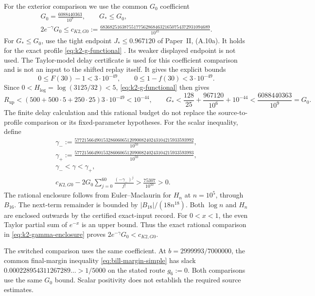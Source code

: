 For the exterior comparison we use the common $G_0$ coefficient
\begin{equation}\label{eq:k2-certificate}
\begin{gathered}
 G_0=\frac{6088440363}{10^9},\qquad
 G_*\le G_0,\\
 2e^{-\gamma}G_0\le c_{K2,G0}
 :=\frac{6836825163875517756286846321650754372931094689}{10^{45}}.
\end{gathered}
\end{equation}
For \(G_*\le G_0\), use the tight endpoint
\(J_*\le0.967120\) of Paper~II, (A.10a). It holds for the exact profile
\eqref{eq:k2-g-functional} \cite[(4.73), (4.75), (A.10a)]{PaperII}.
Its weaker displayed endpoint is not used.
The Taylor-model delay certificate is used for this coefficient comparison
and is not an input to the shifted replay itself. It gives the explicit bounds
\[
 0\le F(30)-1<3\cdot10^{-49},\qquad
 0\le1-f(30)<3\cdot10^{-49}.
\]
Since \(0<H_{\log}=\log(3125/32)<5\),
\eqref{eq:k2-g-functional} then gives
\[
 R_{\mathrm{up}}< (500+500\cdot5+250\cdot25)3\cdot10^{-49}
 <10^{-44},\qquad
 G_*<\frac{128}{25}+\frac{967120}{10^6}+10^{-44}
 <\frac{6088440363}{10^9}=G_0.
\]
The finite delay calculation and this rational budget do not replace the
source-to-profile comparison or its fixed-parameter hypotheses.
For the scalar inequality, define
\begin{equation}\label{eq:k2-gamma-enclosure}
\begin{gathered}
 \gamma_-:=\frac{57721566490153286060651209008240243104215933593992}{10^{50}},\\
 \gamma_+:=\frac{57721566490153286060651209008240243104215933593993}{10^{50}},\\
 \gamma_-<\gamma<\gamma_+,\\
 c_{K2,G0}-2G_0\sum_{j=0}^{60}\frac{(-\gamma_-)^j}{j!}
       >\frac{75307}{10^{50}}>0.
\end{gathered}
\end{equation}
The rational enclosure follows from Euler--Maclaurin for \(H_n\) at
\(n=10^5\), through \(B_{16}\). The next-term remainder is bounded
by \(|B_{18}|/(18n^{18})\). Both \(\log n\) and \(H_n\) are enclosed
outwards by the certified exact-input record. For \(0<x<1\), the even Taylor
partial sum of \(e^{-x}\) is an upper bound. Thus the exact rational
comparison in \eqref{eq:k2-gamma-enclosure} proves
\(2e^{-\gamma}G_0<c_{K2,G0}\).


The switched comparison uses the same coefficient.
At \(b=2999993/7000000\), the common final-margin inequality
\eqref{eq:bill-margin-simple} has slack
\(0.000228954311267289\ldots>1/5000\) on the stated route \(g_6:=0\).
Both comparisons use the same $G_0$ bound. Scalar positivity does not
establish the required source estimates.

